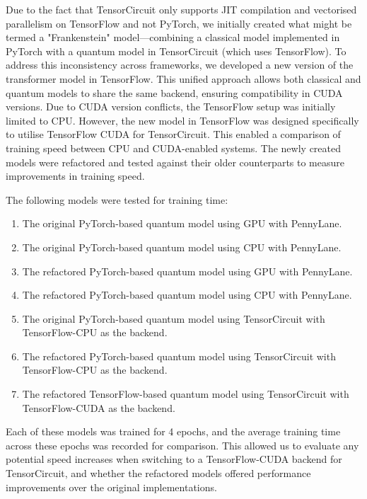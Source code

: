 Due to the fact that TensorCircuit only supports \gls{JIT} compilation and
vectorised parallelism on TensorFlow and not PyTorch, we initially
created what might be termed a "Frankenstein" model—combining a
classical model implemented in PyTorch with a quantum model in
TensorCircuit (which uses TensorFlow). To address this inconsistency
across frameworks, we developed a new version of the transformer
model in TensorFlow. This unified approach allows both classical and
quantum models to share the same backend, ensuring compatibility in
CUDA versions. Due to CUDA version conflicts, the TensorFlow setup
was initially limited to CPU. However, the new model in TensorFlow
was designed specifically to utilise TensorFlow CUDA for
TensorCircuit. This enabled a comparison of training speed between
CPU and CUDA-enabled systems. The newly created models were
refactored and tested against their older counterparts to measure
improvements in training speed.

The following models were tested for training time:

\begin{enumerate}
  \item The original PyTorch-based quantum model using GPU with PennyLane.
  \item The original PyTorch-based quantum model using CPU with PennyLane.
  \item The refactored PyTorch-based quantum model using GPU with PennyLane.
  \item The refactored PyTorch-based quantum model using CPU with PennyLane.
  \item The original PyTorch-based quantum model using TensorCircuit with
    TensorFlow-CPU as the backend.
  \item The refactored PyTorch-based quantum model using TensorCircuit
    with TensorFlow-CPU as the backend.
  \item The refactored TensorFlow-based quantum model using TensorCircuit
    with TensorFlow-CUDA as the backend.
\end{enumerate}

Each of these models was trained for 4 epochs, and the average
training time across these epochs was recorded for comparison. This
allowed us to evaluate any potential speed increases when switching
to a TensorFlow-CUDA backend for TensorCircuit, and whether the
refactored models offered performance improvements over the original
implementations.

